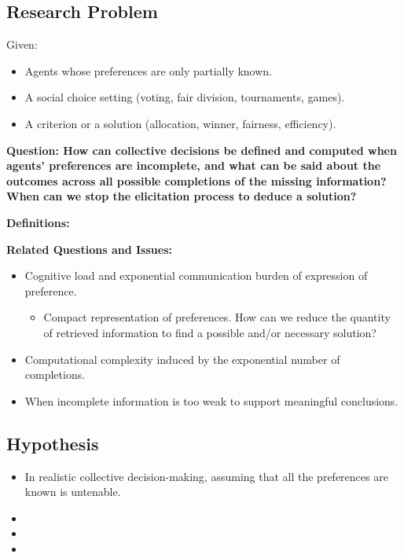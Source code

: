 \documentclass[12pt,a4paper]{article}
\begin{document}
\subsection*{Research Problem}
Given:
\begin{itemize}
    \item Agents whose preferences are only partially known.
    \item A social choice setting (voting, fair division, tournaments, games).
    \item A criterion or a solution (allocation, winner, fairness, efficiency).
\end{itemize}
\textbf{Question: How can collective decisions be defined and computed when agents' preferences are incomplete, and what can be said about the outcomes across all possible completions of the missing information? When can we stop the elicitation process to deduce a solution?}

\textbf{Definitions:}

\textbf{Related Questions and Issues:}
\begin{itemize}
    \item Cognitive load and exponential communication burden of expression of preference.
    \begin{itemize}
        \item Compact representation of preferences. How can we reduce the quantity of retrieved information to find a possible and/or necessary solution? 
    \end{itemize}
    \item Computational complexity induced by the exponential number of completions.
    \item When incomplete information is too weak to support meaningful conclusions.
\end{itemize}

\subsection*{Hypothesis}
\begin{itemize}
    \item In realistic collective decision-making, assuming that all the preferences are known is untenable.
    \item 
    \item 
    \item 
\end{itemize}
\end{document}

